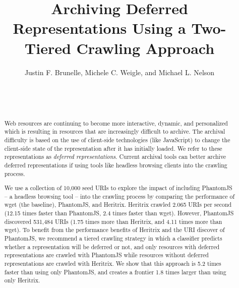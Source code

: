 \documentclass{sig-alternate}
\begin{document}
\title{Archiving Deferred Representations Using a Two-Tiered Crawling Approach}


\author{
\alignauthor
Justin F. Brunelle, Michele C. Weigle, and Michael L. Nelson\\
       \\
       \\
       \\
}

\maketitle
\begin{abstract}
Web resources are continuing to become more interactive, dynamic, and personalized which is resulting in resources that are increasingly difficult to archive. The archival difficulty is based on the use of client-side technologies (like JavaScript) to change the client-side state of the representation after it has initially loaded. We refer to these representations as \emph{deferred representations}. Current archival tools can better archive deferred representations if using tools like headless browsing clients into the crawling process.

We use a collection of 10,000 seed URIs to explore the impact of including PhantomJS -- a headless browsing tool -- into the crawling process by comparing the performance of wget (the baseline), PhantomJS, and Heritrix. Heritrix crawled 2.065 URIs per second (12.15 times faster than PhantomJS, 2.4 times faster than wget). However, PhantomJS discovered 531,484 URIs (1.75 times more than Heritrix, and 4.11 times more than wget). To benefit from the performance benefits of Heritrix and the URI discover of PhantomJS, we recommend a tiered crawling strategy in which a classifier predicts whether a representation will be deferred or not, and only resources with deferred representations are crawled with PhantomJS while resources without deferred representations are crawled with Heritrix. We show that this approach is 5.2 times faster than using only PhantomJS, and creates a frontier 1.8 times larger than using only Heritrix.
\end{abstract}
\end{document}
